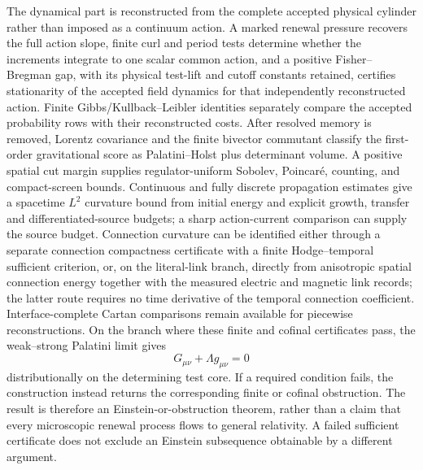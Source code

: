 \documentclass[11pt]{article}
\numberwithin{equation}{section}
\theoremstyle{definition}
\theoremstyle{remark}
\begin{document}
The dynamical part is reconstructed from the complete accepted physical
cylinder rather than imposed as a continuum action.  A marked renewal pressure
recovers the full action slope, finite curl and period tests determine whether
the increments integrate to one scalar common action, and a positive
Fisher--Bregman gap, with its physical test-lift and cutoff constants retained,
certifies stationarity of the accepted field dynamics for that independently
reconstructed action.  Finite Gibbs/Kullback--Leibler identities separately
compare the accepted probability rows with their reconstructed costs.  After resolved memory is removed,
Lorentz covariance and the finite bivector commutant classify the first-order
gravitational score as Palatini--Holst plus determinant volume.  A positive
spatial cut margin supplies regulator-uniform Sobolev, Poincar\'e, counting,
and compact-screen bounds.  Continuous and fully discrete propagation estimates
give a spacetime $L^2$ curvature bound from initial energy and explicit
growth, transfer and differentiated-source budgets; a sharp action-current
comparison can supply the source budget.  Connection curvature can be identified either through a separate
connection compactness certificate with a finite Hodge--temporal sufficient criterion, or, on the literal-link branch, directly from anisotropic spatial connection energy together with the measured electric and magnetic link records; the latter route requires no time derivative of the temporal connection coefficient.  Interface-complete Cartan comparisons remain available for piecewise reconstructions.  On the branch where these finite and cofinal
certificates pass, the weak--strong Palatini limit gives
\begin{equation}
\boxed{G_{\mu\nu}+\Lambda g_{\mu\nu}=0}
\end{equation}
distributionally on the determining test core.  If a required condition fails,
the construction instead returns the corresponding finite or cofinal
obstruction.  The result is therefore an Einstein-or-obstruction theorem,
rather than a claim that every microscopic renewal process flows to general
relativity.  A failed sufficient certificate does not exclude an Einstein
subsequence obtainable by a different argument.
\end{document}
